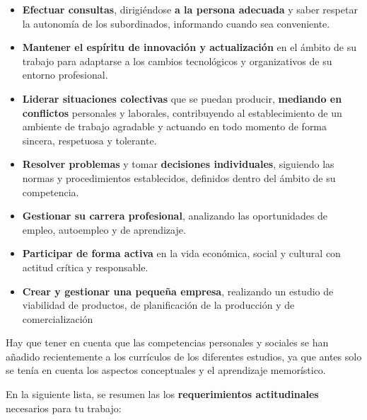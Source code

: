 \begin{itemize}
    \item \textbf{Efectuar consultas}, dirigiéndose \textbf{a la persona adecuada} y saber respetar la autonomía de los subordinados, informando cuando sea conveniente.
    \item \textbf{Mantener el espíritu de innovación y actualización} en el ámbito de su trabajo para adaptarse a los cambios tecnológicos y organizativos de su entorno profesional.
    \item \textbf{Liderar  situaciones colectivas} que se puedan producir, \textbf{mediando en conflictos} personales y laborales, contribuyendo al establecimiento de un ambiente de trabajo agradable y actuando en todo momento de forma sincera, respetuosa y tolerante.
    \item \textbf{Resolver problemas} y tomar \textbf{decisiones individuales}, siguiendo las normas y procedimientos establecidos, definidos dentro del ámbito de su competencia.
    \item \textbf{Gestionar su carrera profesional}, analizando las oportunidades de empleo, autoempleo y de aprendizaje.
    \item \textbf{Participar de forma activa} en la vida económica, social y cultural con actitud crítica y responsable.
    \item \textbf{Crear y gestionar una pequeña empresa}, realizando un estudio de viabilidad de productos, de planificación de la producción y de comercialización
\end{itemize}

Hay que tener en cuenta que las competencias personales y sociales se han añadido recientemente a los currículos de los diferentes estudios, ya que antes solo se tenía en cuenta los aspectos conceptuales y el aprendizaje memorístico.

En la siguiente lista, se resumen las los \textbf{requerimientos actitudinales} necesarios para tu trabajo:

